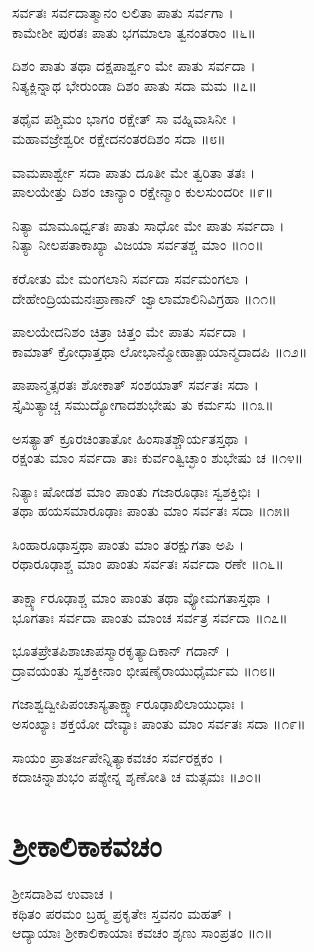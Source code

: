 ಸರ್ವತಃ ಸರ್ವದಾತ್ಮಾನಂ ಲಲಿತಾ ಪಾತು ಸರ್ವಗಾ ।\\
ಕಾಮೇಶೀ ಪುರತಃ ಪಾತು ಭಗಮಾಲಾ ತ್ವನಂತರಾಂ ॥೬॥

ದಿಶಂ ಪಾತು ತಥಾ ದಕ್ಷಪಾರ್ಶ್ವಂ ಮೇ ಪಾತು ಸರ್ವದಾ ।\\
ನಿತ್ಯಕ್ಲಿನ್ನಾಥ ಭೇರುಂಡಾ ದಿಶಂ ಪಾತು ಸದಾ ಮಮ ॥೭॥

ತಥೈವ ಪಶ್ಚಿಮಂ ಭಾಗಂ ರಕ್ಷೇತ್ ಸಾ ವಹ್ನಿವಾಸಿನೀ ।\\
ಮಹಾವಜ್ರೇಶ್ವರೀ ರಕ್ಷೇದನಂತರದಿಶಂ ಸದಾ ॥೮॥

ವಾಮಪಾರ್ಶ್ವೇ ಸದಾ ಪಾತು ದೂತೀ ಮೇ ತ್ವರಿತಾ ತತಃ ।\\
ಪಾಲಯೇತ್ತು ದಿಶಂ ಚಾನ್ಯಾಂ ರಕ್ಷೇನ್ಮಾಂ ಕುಲಸುಂದರೀ ॥೯॥

ನಿತ್ಯಾ ಮಾಮೂರ್ಧ್ವತಃ ಪಾತು ಸಾಧೋ ಮೇ ಪಾತು ಸರ್ವದಾ ।\\
ನಿತ್ಯಾ ನೀಲಪತಾಕಾಖ್ಯಾ ವಿಜಯಾ ಸರ್ವತಶ್ಚ ಮಾಂ ॥೧೦॥

ಕರೋತು ಮೇ ಮಂಗಲಾನಿ ಸರ್ವದಾ ಸರ್ವಮಂಗಲಾ ।\\
ದೇಹೇಂದ್ರಿಯಮನಃಪ್ರಾಣಾನ್ ಜ್ವಾಲಾಮಾಲಿನಿವಿಗ್ರಹಾ ॥೧೧॥

ಪಾಲಯೇದನಿಶಂ ಚಿತ್ರಾ ಚಿತ್ತಂ ಮೇ ಪಾತು ಸರ್ವದಾ ।\\
ಕಾಮಾತ್ ಕ್ರೋಧಾತ್ತಥಾ ಲೋಭಾನ್ಮೋಹಾತ್ಪಾಯಾನ್ಮದಾದಪಿ ॥೧೨॥

ಪಾಪಾನ್ಮತ್ಸರತಃ ಶೋಕಾತ್ ಸಂಶಯಾತ್ ಸರ್ವತಃ ಸದಾ ।\\
ಸ್ತೈಮಿತ್ಯಾಚ್ಚ ಸಮುದ್ಯೋಗಾದಶುಭೇಷು ತು ಕರ್ಮಸು ॥೧೩॥

ಅಸತ್ಯಾತ್ ಕ್ರೂರಚಿಂತಾತೋ ಹಿಂಸಾತಶ್ಚೌರ್ಯತಸ್ತಥಾ ।\\
ರಕ್ಷಂತು ಮಾಂ ಸರ್ವದಾ ತಾಃ ಕುರ್ವಂತ್ವಿಚ್ಛಾಂ ಶುಭೇಷು ಚ ॥೧೪॥

ನಿತ್ಯಾಃ ಷೋಡಶ ಮಾಂ ಪಾಂತು ಗಜಾರೂಢಾಃ ಸ್ವಶಕ್ತಿಭಿಃ ।\\
ತಥಾ ಹಯಸಮಾರೂಢಾಃ ಪಾಂತು ಮಾಂ ಸರ್ವತಃ ಸದಾ ॥೧೫॥

ಸಿಂಹಾರೂಢಾಸ್ತಥಾ ಪಾಂತು ಮಾಂ ತರಕ್ಷುಗತಾ ಅಪಿ ।\\
ರಥಾರೂಢಾಶ್ಚ ಮಾಂ ಪಾಂತು ಸರ್ವತಃ ಸರ್ವದಾ ರಣೇ ॥೧೬॥

ತಾರ್ಕ್ಷ್ಯಾರೂಢಾಶ್ಚ ಮಾಂ ಪಾಂತು ತಥಾ ವ್ಯೋಮಗತಾಸ್ತಥಾ ।\\
ಭೂಗತಾಃ ಸರ್ವದಾ ಪಾಂತು ಮಾಂಚ ಸರ್ವತ್ರ ಸರ್ವದಾ ॥೧೭॥

ಭೂತಪ್ರೇತಪಿಶಾಚಾಪಸ್ಮಾರಕೃತ್ಯಾದಿಕಾನ್ ಗದಾನ್ ।\\
ದ್ರಾವಯಂತು ಸ್ವಶಕ್ತೀನಾಂ ಭೀಷಣೈರಾಯುಧೈರ್ಮಮ ॥೧೮॥

ಗಜಾಶ್ವದ್ವೀಪಿಪಂಚಾಸ್ಯತಾರ್ಕ್ಷ್ಯಾರೂಢಾಖಿಲಾಯುಧಾಃ ।\\
ಅಸಂಖ್ಯಾಃ ಶಕ್ತಯೋ ದೇವ್ಯಾಃ ಪಾಂತು ಮಾಂ ಸರ್ವತಃ ಸದಾ ॥೧೯॥

ಸಾಯಂ ಪ್ರಾತರ್ಜಪೇನ್ನಿತ್ಯಾಕವಚಂ ಸರ್ವರಕ್ಷಕಂ ।\\
ಕದಾಚಿನ್ನಾಶುಭಂ ಪಶ್ಯೇನ್ನ ಶೃಣೋತಿ ಚ ಮತ್ಸಮಃ ॥೨೦॥
\newpage
\section{ಶ್ರೀಕಾಲಿಕಾಕವಚಂ}
ಶ್ರೀಸದಾಶಿವ ಉವಾಚ ।\\
ಕಥಿತಂ ಪರಮಂ ಬ್ರಹ್ಮ ಪ್ರಕೃತೇಃ ಸ್ತವನಂ ಮಹತ್ ।\\
ಆದ್ಯಾಯಾಃ ಶ್ರೀಕಾಲಿಕಾಯಾಃ ಕವಚಂ ಶೃಣು ಸಾಂಪ್ರತಂ ॥೧॥

